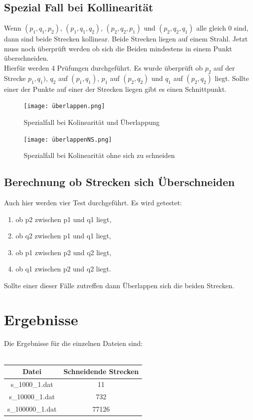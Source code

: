 \documentclass[conference]{IEEEtran}
\begin{document}
\subsection{Spezial Fall bei Kollinearität}
Wenn $(p_1,q_1,p_2)$, $(p_1,q_1,q_2)$, $(p_2,q_2,p_1)$ und $(p_2,q_2,q_1)$ alle gleich 0 sind, dann sind beide Strecken kollinear. Beide Strecken liegen auf einem Strahl. Jetzt muss noch überprüft werden ob sich die Beiden mindestens in einem Punkt überschneiden.\\
Hierfür werden 4 Prüfungen durchgeführt. Es wurde überprüft ob $p_2$ auf der Strecke $p_1,q_1)$, $q_2$ auf $(p_1,q_1)$, $p_1$ auf $(p_2,q_2)$ und $q_1$ auf $(p_2,q_2)$ liegt. Sollte einer der Punkte auf einer der Strecken liegen gibt es einen Schnittpunkt.
\begin{figure}[h]
	\begin{center}
		\texttt{[image: überlappen.png]}
		\caption{Spezialfall bei Kolinearität und Überlappung}
		\label{figure_3}
	\end{center}
\end{figure}
\begin{figure}[h]
	\begin{center}
		\texttt{[image: überlappenNS.png]}
		\caption{Spezialfall bei Kolinearität ohne sich zu schneiden}
		\label{figure_3}
	\end{center}
\end{figure}

\subsection{Berechnung ob Strecken sich Überschneiden}
Auch hier werden vier Test durchgeführt. Es wird getestet:
\begin{enumerate}
	\item ob p2 zwischen p1 und q1 liegt,
	\item ob q2 zwischen p1 und q1  liegt,
	\item ob p1 zwischen p2 und q2 liegt,
	\item ob q1 zwischen p2 und q2 liegt.
\end{enumerate}
Sollte einer dieser Fälle zutreffen dann Überlappen sich die beiden Strecken.

 
\section{Ergebnisse}
Die Ergebnisse für die einzelnen Dateien sind:\\
\vspace{0.2cm}\\
\begin{tabular}{|c|c|}
	\hline
	Datei & Schneidende Strecken \\
	\hline
	s\_1000\_1.dat & 11 \\
	\hline
	s\_10000\_1.dat & 732 \\
	\hline
	s\_100000\_1.dat & 77126 \\
	\hline
\end{tabular}
\end{document}
